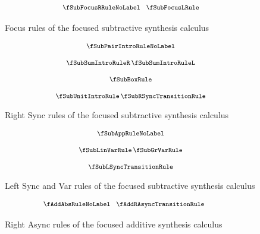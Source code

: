 \begin{figure}[H]
  \begin{align*}
    {\footnotesize{
\begin{array}{c}
  \fSubFocusRRuleNoLabel
  \;\;\;
  \fSubFocusLRule
  \end{array}
    }}
  \end{align*}
  \caption{Focus rules of the focused subtractive synthesis calculus}
  \label{fig:focus-sub-focus}
\end{figure}

\begin{figure}[H]
  \begin{align*}
    {\footnotesize{
\begin{array}{c}
\fSubPairIntroRuleNoLabel
  \\[1.25em]
  \fSubSumIntroRuleR
  \,
  \fSubSumIntroRuleL
  \\[1.25em]
  \fSubBoxRule
  \\[1.25em]
  \fSubUnitIntroRule
  \,
  \fSubRSyncTransitionRule
  \end{array}
    }}
  \end{align*}
  \caption{Right Sync rules of the focused subtractive synthesis calculus}
  \label{fig:focus-sub-right-sync}
\end{figure}

\begin{figure}[H]
  \begin{align*}
    {\footnotesize{
\begin{array}{c}
  \fSubAppRuleNoLabel
  \\[1.25em]
  \fSubLinVarRule
  \,
  \fSubGrVarRule
  \\[1.25em]
  \fSubLSyncTransitionRule
  \end{array}
    }}
  \end{align*}
  \caption{Left Sync and Var rules of the focused subtractive synthesis calculus}
  \label{fig:focus-sub-left-sync}
\end{figure}

\begin{figure}[H]
  \begin{align*}
    {\footnotesize{
\hspace{-2em}\begin{array}{c}
  \fAddAbsRuleNoLabel
  \;\;\;
  \fAddRAsyncTransitionRule
  \end{array}
    }}
  \end{align*}
  \caption{Right Async rules of the focused additive synthesis calculus}
  \label{fig:focus-add-right-async}
\end{figure}

